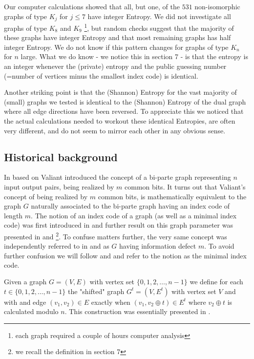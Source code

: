 \documentclass[12pt]{article}
\begin{document}
Our computer calculations showed that all, but one, of the $531$ non-isomorphic graphs of type $K_j$ for $j \leq 7$ have integer Entropy. 
We did not investigate all graphs of type $K_8$ and $K_9$ \footnote{each graph required a couple of hours computer analysis}, but random checks suggest that the majority of these graphs have integer Entropy and that most remaining graphs has half integer Entropy. We do not know if this pattern changes for graphs of type $K_n$ for $n$ large.  What we do know - we notice this in section 7 - is that the entropy is an integer whenever the (private) entropy and the public guessing number (=number of 
vertices minus the smallest index code) is identical.

Another striking point is that the (Shannon) Entropy for the vast majority of (small) graphs we tested is identical to the (Shannon) Entropy of the dual graph where all edge directions have been reversed.
To appreciate this we noticed that the actual calculations needed to workout these identical Entropies, are often very different, and do not seem to mirror each other in any obvious sense.  

\subsection{Historical background}
In \cite{Val} based on \cite{Valorg} Valiant introduced the concept of a bi-parte graph representing $n$ input output pairs, being realized by $m$ common bits. It turns out that Valiant's concept of being realized by $m$ common bits, is mathematically equivalent to the graph $G$ naturally associated to the bi-parte graph having an index code of length $m$.  The notion of an index code of a graph (as well as a minimal index code) was first introduced in \cite{Tel98} and further result on this graph parameter was presented in \cite{Tel06} and \cite{Tel07}  \footnote{we recall the definition in section 7}.
To confuse matters further, the very same concept was  independently referred to in \cite{Riis05} and \cite{Riis07} as $G$ having information defect $m$. To avoid further confusion we will follow
\cite {Tel98,Tel06} and \cite{Tel07} and refer to the notion as the minimal index code. 

Given a graph $G=(V,E)$ with vertex set $\{0,1,2,\ldots,n-1\}$ we define for each $t \in \{0,1,2,\ldots,n-1\}$ the "shifted" graph $G^t=(V,E^t)$ with vertex set $V$ and with and edge $(v_1,v_2) \in E$
exactly when $(v_1, v_2 \oplus t) \in E^t$ where $v_2 \oplus t$ is calculated modulo $n$. This construction was essentially presented in \cite{Val18}.
\end{document}
